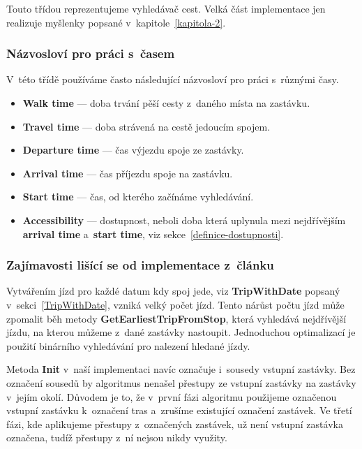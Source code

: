 Touto třídou reprezentujeme vyhledávač cest. Velká část implementace jen realizuje myšlenky popsané v~kapitole~\ref{kapitola-2}.

\subsubsection{Názvosloví pro práci s~časem}\label{NazvosloviCasu}

V~této třídě používáme často následující názvosloví pro práci s~různými časy.
\begin{itemize}
    \item \textbf{Walk time} --- doba trvání pěší cesty z~daného místa na zastávku.
    \item \textbf{Travel time} --- doba strávená na cestě jedoucím spojem.
    \item \textbf{Departure time} --- čas výjezdu spoje ze zastávky. 
    \item \textbf{Arrival time} --- čas příjezdu spoje na zastávku.
    \item \textbf{Start time} --- čas, od kterého začínáme vyhledávání.
    \item \textbf{Accessibility} --- dostupnost, neboli doba která uplynula mezi nejdřívějším \textbf{arrival time} a~\textbf{start time}, viz sekce~\ref{definice-dostupnosti}.
\end{itemize}

\subsubsection{Zajímavosti lišící se od implementace z~článku}

Vytvářením jízd pro každé datum kdy spoj jede, viz \textbf{TripWithDate} popsaný v~sekci~\ref{TripWithDate}, vzniká velký počet jízd. Tento nárůst počtu jízd může zpomalit běh metody \textbf{GetEarliestTripFromStop}, která vyhledává nejdřívější jízdu, na kterou můžeme z~dané zastávky nastoupit. Jednoduchou optimalizací je použití binárního vyhledávání pro nalezení hledané jízdy.

Metoda \textbf{Init} v~naší implementaci navíc označuje i~sousedy vstupní zastávky. Bez označení sousedů by algoritmus nenašel přestupy ze vstupní zastávky na zastávky v~jejím okolí. Důvodem je to, že v~první fázi algoritmu použijeme označenou vstupní zastávku k~označení tras a~zrušíme existující označení zastávek. Ve třetí fázi, kde aplikujeme přestupy z~označených zastávek, už není vstupní zastávka označena, tudíž přestupy z~ní nejsou nikdy využity.

